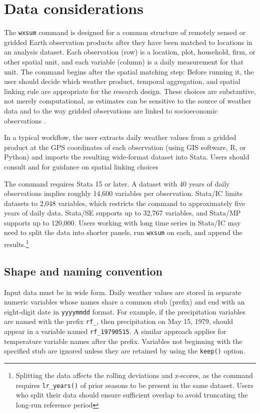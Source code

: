 \section{Data considerations}

The \texttt{wxsum} command is designed for a common structure of remotely sensed or gridded Earth observation products after they have been matched to locations in an analysis dataset. Each observation (row) is a location, plot, household, firm, or other spatial unit, and each variable (column) is a daily measurement for that unit. The command begins after the spatial matching step: Before running it, the user should decide which weather product, temporal aggregation, and spatial linking rule are appropriate for the research design. These choices are substantive, not merely computational, as estimates can be sensitive to the source of weather data and to the way gridded observations are linked to socioeconomic observations \citep{AuffhammerEtAl13, DonaldsonStoreygard16, MichlerEtAl26}.

In a typical workflow, the user extracts daily weather values from a gridded product at the GPS coordinates of each observation (using GIS software, R, or Python) and imports the resulting wide-format dataset into Stata. Users should consult \citet{MichlerEtAl22} and \citet{MichlerEtAl26} for guidance on spatial linking choices

The command requires Stata 15 or later. A dataset with 40 years of daily observations implies roughly 14,600 variables per observation. Stata/IC limits datasets to 2,048 variables, which restricts the command to approximately five years of daily data. Stata/SE supports up to 32,767 variables, and Stata/MP supports up to 120,000. Users working with long time series in Stata/IC may need to split the data into shorter panels, run \texttt{wxsum} on each, and append the results.\footnote{Splitting the data affects the rolling deviations and z-scores, as the command requires \texttt{lr\_years()} of prior seasons to be present in the same dataset. Users who split their data should ensure sufficient overlap to avoid truncating the long-run reference period}

\subsection{Shape and naming convention}

Input data must be in wide form. Daily weather values are stored in separate numeric variables whose names share a common stub (prefix) and end with an eight-digit date in \texttt{yyyymmdd} format. For example, if the precipitation variables are named with the prefix \texttt{rf\_}, then precipitation on May 15, 1979, should appear in a variable named \texttt{rf\_19790515}. A similar approach applies for temperature variable names after the prefix. Variables not beginning with the specified stub are ignored unless they are retained by using the \texttt{keep()} option.

